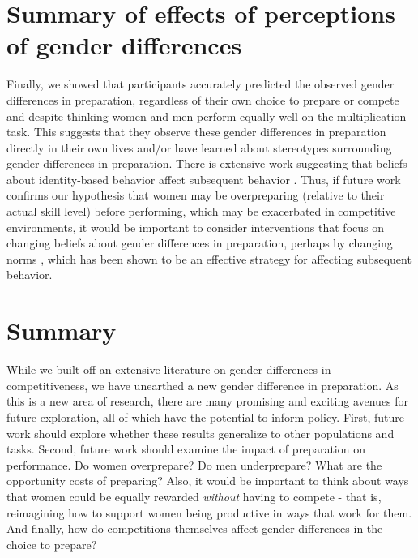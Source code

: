 \documentclass[a4paper, nobind]{templates/ociamthesis}
\begin{document}
\hypertarget{summary-of-effects-of-perceptions-of-gender-differences}{%
\section{Summary of effects of perceptions of gender differences}\label{summary-of-effects-of-perceptions-of-gender-differences}}

Finally, we showed that participants accurately predicted the observed gender differences in preparation, regardless of their own choice to prepare or compete and despite thinking women and men perform equally well on the multiplication task. This suggests that they observe these gender differences in preparation directly in their own lives and/or have learned about stereotypes surrounding gender differences in preparation. There is extensive work suggesting that beliefs about identity-based behavior affect subsequent behavior \autocite{Babcock2012,Bowles2007,Toosi2019,Smith2014,Benjamin2010c,Bertrand2015,Akerlof2000}. Thus, if future work confirms our hypothesis that women may be overpreparing (relative to their actual skill level) before performing, which may be exacerbated in competitive environments, it would be important to consider interventions that focus on changing beliefs about gender differences in preparation, perhaps by changing norms \autocite{Miller2016}, which has been shown to be an effective strategy for affecting subsequent behavior.

\hypertarget{summary}{%
\section{Summary}\label{summary}}

While we built off an extensive literature on gender differences in competitiveness, we have unearthed a new gender difference in preparation. As this is a new area of research, there are many promising and exciting avenues for future exploration, all of which have the potential to inform policy. First, future work should explore whether these results generalize to other populations and tasks. Second, future work should examine the impact of preparation on performance. Do women overprepare? Do men underprepare? What are the opportunity costs of preparing? Also, it would be important to think about ways that women could be equally rewarded \emph{without} having to compete - that is, reimagining how to support women being productive in ways that work for them. And finally, how do competitions themselves affect gender differences in the choice to prepare?
\end{document}
